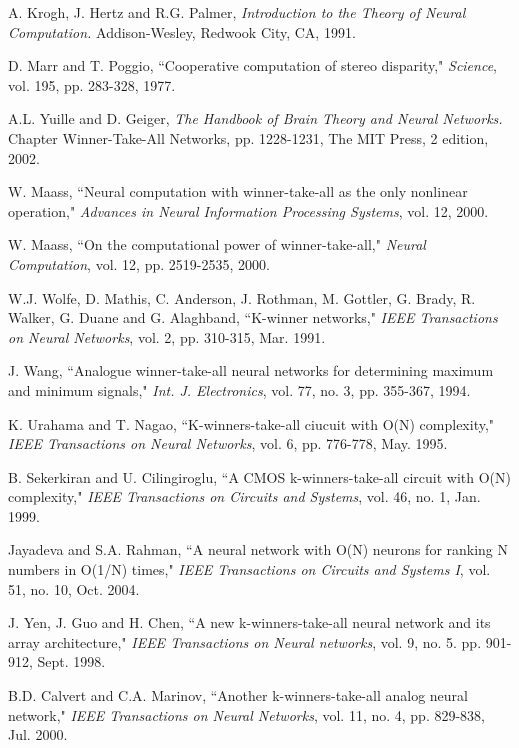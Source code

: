 \documentclass[conference]{IEEEtran}
\begin{document}
\begin{thebibliography}{22}
 A. Krogh, J. Hertz and R.G. Palmer,
        {\it Introduction to the Theory of Neural Computation.}
        Addison-Wesley, Redwook City, CA, 1991.

 D. Marr and T. Poggio, ``Cooperative computation of stereo disparity,"
        {\it Science}, vol. 195, pp. 283-328, 1977.

 A.L. Yuille and D. Geiger,
        {\it The Handbook of Brain Theory and Neural Networks.}
        Chapter Winner-Take-All Networks, pp. 1228-1231, The MIT Press, 2 edition, 2002.

 W. Maass, ``Neural computation with winner-take-all as the only nonlinear
operation,"
        {\it Advances in Neural Information Processing Systems}, vol. 12, 2000.

 W. Maass, ``On the computational power of
winner-take-all,"
        {\it Neural Computation}, vol. 12, pp. 2519-2535, 2000.

 W.J. Wolfe, D. Mathis, C. Anderson, J. Rothman, M. Gottler, G. Brady, R. Walker, G. Duane and G. Alaghband, ``K-winner networks,"
        {\it IEEE Transactions on Neural Networks}, vol. 2, pp. 310-315, Mar. 1991.

 J. Wang, ``Analogue winner-take-all neural networks for determining maximum and minimum signals,"
        {\it Int. J. Electronics}, vol. 77, no. 3, pp. 355-367, 1994.

 K. Urahama and T. Nagao, ``K-winners-take-all ciucuit with O(N) complexity,"
        {\it IEEE Transactions on Neural Networks}, vol. 6, pp. 776-778, May. 1995.

 B. Sekerkiran and U. Cilingiroglu, ``A CMOS k-winners-take-all circuit with O(N) complexity,"
        {\it IEEE Transactions on Circuits and Systems}, vol. 46, no. 1, Jan. 1999.

 Jayadeva and S.A. Rahman, ``A neural network with O(N) neurons for ranking N numbers in O(1/N) times,"
        {\it IEEE Transactions on Circuits and Systems I}, vol. 51, no. 10, Oct. 2004.

 J. Yen, J. Guo and H. Chen, ``A new k-winners-take-all neural network and its array architecture,"
        {\it IEEE Transactions on Neural networks}, vol. 9, no. 5. pp. 901-912, Sept. 1998.

 B.D. Calvert and C.A. Marinov, ``Another k-winners-take-all analog neural network,"
        {\it IEEE Transactions on Neural Networks}, vol. 11, no. 4, pp. 829-838, Jul. 2000.


\end{thebibliography}
\end{document}
